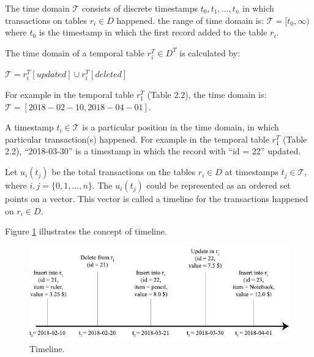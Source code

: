 		\begin{defn}
			The time domain $\mathcal{T}$ consists of discrete timestamps $t_0,t_1,...,t_n$ in which transactions on tables $r_i \in D$ happened. the range of time domain is: $\mathcal{T} = [t_0, \infty)$ where $t_0$ is the timestamp in which the first record added to the table $r_i$.
		\label{dfn:time_domain}
		\end{defn}

		The time domain of a temporal table $r_i^T \in D^T $ is calculated by:

		\begin{center}
			$\mathcal{T} = r_i^T[updated] \cup r_i^T[deleted]$
		\end{center}
		For example in the temporal table $r_1^T$ (Table 2.2), the time domain is:
		$\mathcal{T} = [2018-02-10,2018-04-01]$.
		\begin{defn}[Timestamps]
			A timestamp $t_i \in \mathcal{T}$ is a particular position in the time domain, in which particular transaction(s) happened. For example in the temporal table $r_1^T$ (Table 2.2), ``2018-03-30'' is a timestamp in which the record with ``id = 22'' updated.
		\label{dfn:timestamp}
		\end{defn}
		\begin{defn}[Timeline]
			Let $u_i(t_j)$ be the total transactions on the tables $r_i \in D$ at timestamps $t_j \in \mathcal{T}$, where $i,j=\{0,1,...,n\}$. The $u_i(t_j)$ could be represented as an ordered set points on a vector. This vector is called a timeline for the transactions happened on $r_i \in D$.
		\label{dfn:timeline}
		\end{defn}
		Figure \ref{fig:timeline} illustrates the concept of timeline.

		\begin{figure}
			\centering
			\includegraphics[width=\textwidth]{figs/timeline.pdf}
			\caption{Timeline.}
			\label{fig:timeline}
		\end{figure}

